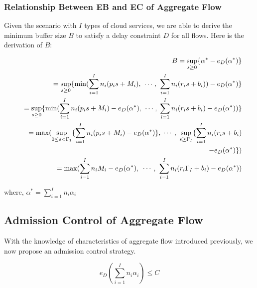 \documentclass[a4paper]{article}
\begin{document}
\subsubsection{Relationship Between EB and EC of Aggregate Flow}

Given the scenario with $I$ types of cloud services, we are able to derive the minimum buffer size $B$ to satisfy a delay constraint $D$ for all flows. Here is the derivation of $B$:


\begin{eqnarray}
&&B = {\sup _{s \ge 0}}\{ {\alpha ^*} - {e_D}({\alpha ^*})\} \nonumber \\
  &&= {\sup _{s \ge 0}}\{ \min (\sum\limits_{i = 1}^I {{n_i}({p_i}s + {M_i})} ,{\kern 1pt} {\kern 1pt}  \cdots {\kern 1pt} ,{\kern 1pt} {\kern 1pt} \sum\limits_{i = 1}^I {{n_i}({r_i}s + {b_i})} ) - {e_D}({\alpha ^*})\}\nonumber \\
  &&= {\sup _{s \ge 0}}\{ \min (\sum\limits_{i = 1}^I {{n_i}({p_i}s + {M_i})}  - {e_D}({\alpha ^*}),{\kern 1pt} {\kern 1pt}  \cdots {\kern 1pt} ,{\kern 1pt} \sum\limits_{i = 1}^I {{n_i}({r_i}s + {b_i}) - {e_D}({\alpha ^*})} )\}\nonumber \\
  &&= \max ({\sup _{0 \le s < {\Gamma _1}}}\{ \sum\limits_{i = 1}^I {{n_i}({p_i}s + {M_i})}  - {e_D}({\alpha ^*})\} ,{\kern 1pt}  \cdots {\kern 1pt} {\kern 1pt} ,{\kern 1pt} {\kern 1pt} {\kern 1pt} {\sup _{s \ge {\Gamma _I}}}\{ \sum\limits_{i = 1}^I {{n_i}({r_i}s + {b_i})}\nonumber \\
  &&- {e_D}({\alpha ^*})\} )\nonumber\\
  &&= \max (\sum\limits_{i = 1}^I {{n_i}{M_i}}  - {e_D}({\alpha ^*}),{\kern 1pt} {\kern 1pt} {\kern 1pt}  \cdots {\kern 1pt} {\kern 1pt} ,{\kern 1pt} {\kern 1pt} \sum\limits_{i = 1}^I {{n_i}({r_i}{\Gamma _I} + {b_i}) - {e_D}({\alpha ^*})} )
  \label{eq:2.8}
\end{eqnarray}


where, ${\alpha ^*} = \sum\limits_{i = 1}^I {{n_i}{\alpha _i}} $

\subsection{Admission Control of Aggregate Flow}

With the knowledge of characteristics of aggregate flow introduced previously, we now propose an admission control strategy.

\begin{equation}
{e_D}(\sum\limits_{i = 1}^I {{n_i}{\alpha _i}} ) \le C
\label{eq:2.9}
\end{equation}
\end{document}
